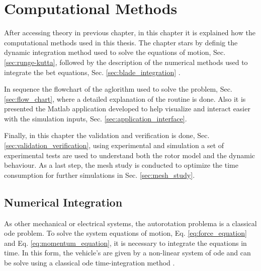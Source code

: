 
\chapter{Computational Methods}
\label{chapter:computational_methods}

After accessing theory in previous chapter, in this chapter it is explained how the computational methods used in this thesis. The chapter stars by definig the dynamic integration method used to solve the equations of motion, Sec. \ref{sec:runge-kutta}, followed by the description of the numerical methods used to integrate the \gls{bet} equations, Sec. \ref{sec:blade_integration} .

In sequence the flowchart of the aglorithm used to solve the problem, Sec. \ref{sec:flow_chart}, where a detailed explanation of the routine is done. Also it is presented the Matlab application developed to help visualize and interact easier with the simulation inputs, Sec. \ref{sec:application_interface}.

Finally, in this chapter the validation and verification is done, Sec. \ref{sec:validation_verification}, using experimental and simulation a set of experimental tests are used to understand both the rotor model and the dynamic behaviour. As a last step, the mesh study is conducted to optimize the time consumption for further simulations in Sec. \ref{sec:mesh_study}.

\section{Numerical Integration}

As other mechanical or electrical systems, the autorotation problema is a classical \gls{ode} problem. To solve the system equations of motion, Eq. \ref{eq:force_equation} and Eq. \ref{eq:momentum_equation}, it is necessary to integrate the equations in time. In this form, the vehicle's are given by a non-linear system of \gls{ode} and can be solve using a classical \gls{ode} time-integration method \cite{arnold_numerical_2011, press_numerical_2007, lindfield_numerical_2019}.

